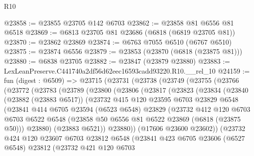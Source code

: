 \begin{lexlean}{R10}
\begin{coremodule}
@23858 := @23855 @23705 @142 @6703
@23862 := @23858 @81 @6556 @81 @6518
@23869 := @6813 @23705 @81 @23686 (@6818 (@6819 @23705 @81))
@23870 := @23862 @23869
@23874 := @6763 @7055 @6510 (@6767 @6510)
@23875 := @23874 @6556
@23879 := @23853 (@23870 (@6818 (@23875 @81)))
@23880 := @6838 @23705
@23882 := @23847 (@23879 @23880)
@23883 := LexLeanPreserve.C441740a2df56d62eec16593cadd93220.R10.__rel_10
@24159 := fun (digest : @6509) =>
  @23715
    (@23731
      (@23738
        (@23749
          (@23755
            (@23766
              (@23772
                (@23783
                  (@23789
                    (@23800
                      (@23806
                        (@23817
                          (@23823
                            (@23834
                              (@23840
                                (@23882 (@23883 @6517))
                                (@23732
                                  @415
                                  @120
                                  @23595
                                  @6703
                                  @23829
                                  @6548
                                  (@23841
                                    @414
                                    @6705
                                    @23594
                                    (@6523 @6548)
                                    @23829
                                    (@23732
                                      @412
                                      @120
                                      @6703
                                      @6703
                                      @6522
                                      @6548
                                      (@23858 @50 @6556 @81 @6522 @23869 (@6818 (@23875 @50)))
                                      @23880)
                                    (@23883 @6521))
                                  @23880))
                              (@17606 @23600 @23602))
                            (@23732
                              @424
                              @120
                              @23607
                              @6703
                              @23812
                              @6548
                              (@23841
                                @423
                                @6705
                                @23606
                                (@6527 @6548)
                                @23812
                                (@23732
                                  @421
                                  @120
                                  @6703

\end{coremodule}
\end{lexlean}
